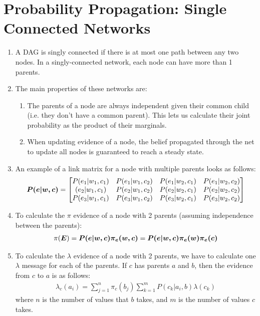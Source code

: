 \documentclass[12pt,twoside]{article}
\begin{document}
\section{Probability Propagation: Single Connected Networks}
\begin{enumerate}
\item A DAG is singly connected if there is at most one path between any two nodes. In a singly-connected network, each node can have more than 1 parents.
\item The main properties of these networks are:
\begin{enumerate}
\item The parents of a node are always independent given their common child (i.e. they don't have a common parent). This lets us calculate their joint probability as the product of their marginals.
\item When updating evidence of a node, the belief propagated through the net to update all nodes is guaranteed to reach a steady state.
\end{enumerate}

\item An example of a link matrix for a node with multiple parents looks as follows:
\begin{align*}
{\boldsymbol{{P(e|w,c)}}} = \begin{bmatrix} 
P(e_1|w_1,c_1) & P(e_1|w_1,c_2) & P(e_1|w_2,c_1) & P(e_1|w_2,c_2)\\ 
(e_2|w_1,c_1) & P(e_2|w_1,c_2) & P(e_2|w_2,c_1) & P(e_2|w_2,c_2) \\ 
P(e_3|w_1,c_1) & P(e_3|w_1,c_2) & P(e_3|w_2,c_1) & P(e_3|w_2,c_2) \end{bmatrix}
\end{align*}


\item To calculate the \(\pi\) evidence of a node with 2 parents (assuming independence between the parents): 
\begin{align*} 
\pi({\boldsymbol{{E}}}) = {\boldsymbol{{P(e|w,c)}}}{\boldsymbol{{\pi_e(w,c)}}} = {\boldsymbol{{P(e|w,c)}}}{\boldsymbol{{\pi_e(w)\pi_e(c)}}}
\end{align*}

\item To calculate the \(\lambda\) evidence of a node with 2 parents, we have to calculate one \(\lambda\) message for each of the parents. If \(c\) has parents \(a\) and \(b\), then the evidence from \(c\) to \(a\) is as follows: 
\begin{align*} 
\lambda_c(a_i) = \sum_{j=1}^n\pi_{c}(b_j)\sum_{k=1}^m P(c_k|a_i,b)\lambda(c_k)
\end{align*}
where \(n\) is the number of values that \(b\) takes, and \(m\) is the number of values \(c\) takes. 



\end{enumerate}
\end{document}
